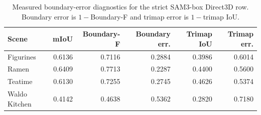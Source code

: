 \begin{table}[t]
\centering
\caption{Measured boundary-error diagnostics for the strict SAM3-box Direct3D row. Boundary error is $1-$Boundary-F and trimap error is $1-$trimap IoU.}
\label{tab:boundary_error_readout}
\begin{tabular}{lrrrrr}
\toprule
Scene & mIoU & Boundary-F & Boundary err. & Trimap IoU & Trimap err. \\
\midrule
Figurines & 0.6136 & 0.7116 & 0.2884 & 0.3986 & 0.6014 \\
Ramen & 0.6409 & 0.7713 & 0.2287 & 0.4400 & 0.5600 \\
Teatime & 0.6130 & 0.7255 & 0.2745 & 0.4626 & 0.5374 \\
Waldo Kitchen & 0.4142 & 0.4638 & 0.5362 & 0.2820 & 0.7180 \\
\bottomrule
\end{tabular}
\end{table}
